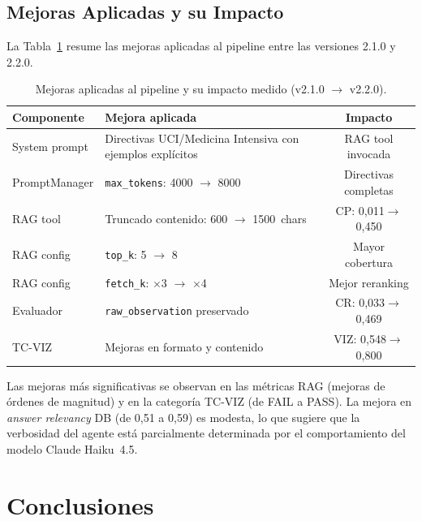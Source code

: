 \documentclass[11pt,a4paper,twocolumn]{article}
\begin{document}
\subsection{Mejoras Aplicadas y su Impacto}

La Tabla~\ref{tab:mejoras} resume las mejoras aplicadas al pipeline entre las versiones 2.1.0 y 2.2.0.

\begin{table}[H]
\centering
\caption{Mejoras aplicadas al pipeline y su impacto medido (v2.1.0 $\rightarrow$ v2.2.0).}
\label{tab:mejoras}
\footnotesize
\begin{tabularx}{\columnwidth}{lXc}
\toprule
\textbf{Componente} & \textbf{Mejora aplicada} & \textbf{Impacto} \\
\midrule
System prompt & Directivas UCI/Medicina Intensiva con ejemplos expl\'{i}citos & RAG tool invocada \\
\addlinespace
PromptManager & \texttt{max\_tokens}: 4000 $\rightarrow$ 8000 & Directivas completas \\
\addlinespace
RAG tool & Truncado contenido: 600 $\rightarrow$ 1500~chars & CP: 0,011$\rightarrow$0,450 \\
\addlinespace
RAG config & \texttt{top\_k}: 5 $\rightarrow$ 8 & Mayor cobertura \\
\addlinespace
RAG config & \texttt{fetch\_k}: $\times$3 $\rightarrow$ $\times$4 & Mejor reranking \\
\addlinespace
Evaluador & \texttt{raw\_observation} preservado & CR: 0,033$\rightarrow$0,469 \\
\addlinespace
TC-VIZ & Mejoras en formato y contenido & VIZ: 0,548$\rightarrow$0,800 \\
\bottomrule
\end{tabularx}
\end{table}

Las mejoras m\'{a}s significativas se observan en las m\'{e}tricas RAG (mejoras de \'{o}rdenes de magnitud) y en la categor\'{i}a TC-VIZ (de FAIL a PASS). La mejora en \textit{answer relevancy} DB (de 0,51 a 0,59) es modesta, lo que sugiere que la verbosidad del agente est\'{a} parcialmente determinada por el comportamiento del modelo Claude Haiku~4.5.

\section{Conclusiones}
\label{sec:conclusiones}
\end{document}
